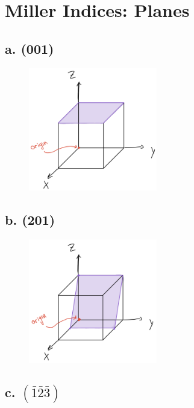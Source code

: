 \documentclass{article}
\begin{document}
\section{Miller Indices: Planes}

\subsection*{a. (001)}

\begin{figure}[H]
    \centering
    \includegraphics[width=0.5\textwidth]{4a.png}
\end{figure}

\subsection*{b. (201)}

\begin{figure}[H]
    \centering
    \includegraphics[width=0.5\textwidth]{4b.png}
\end{figure}

\subsection*{c. \small $\left(\bar{1}\bar{2}\bar{3}\right)$}
\end{document}
